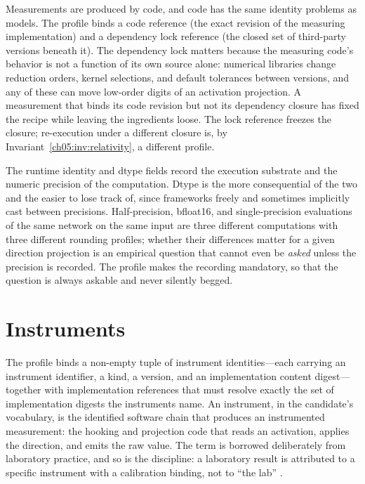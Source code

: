 Measurements are produced by code, and code has the same identity problems
as models. The profile binds a code reference (the exact revision of the
measuring implementation) and a dependency lock reference (the closed set of
third-party versions beneath it). The dependency lock matters because the
measuring code's behavior is not a function of its own source alone:
numerical libraries change reduction orders, kernel selections, and default
tolerances between versions, and any of these can move low-order digits of
an activation projection. A measurement that binds its code revision but not
its dependency closure has fixed the recipe while leaving the ingredients
loose. The lock reference freezes the closure; re-execution under a
different closure is, by
Invariant~\ref{ch05:inv:relativity}, a different profile.

The runtime identity and dtype fields record the execution substrate and the
numeric precision of the computation. Dtype is the more consequential of
the two and the easier to lose track of, since frameworks freely and
sometimes implicitly cast between precisions. Half-precision, bfloat16, and
single-precision evaluations of the same network on the same input are three
different computations with three different rounding profiles; whether their
differences matter for a given direction projection is an empirical question
that cannot even be \emph{asked} unless the precision is recorded. The
profile makes the recording mandatory, so that the question is always
askable and never silently begged.

\section{Instruments}\label{ch05:instruments}

The profile binds a non-empty tuple of instrument identities---each carrying
an instrument identifier, a kind, a version, and an implementation content
digest---together with implementation references that must resolve exactly
the set of implementation digests the instruments name. An instrument, in
the candidate's vocabulary, is the identified software chain that produces
an instrumented measurement: the hooking and projection code that reads an
activation, applies the direction, and emits the raw value. The term is
borrowed deliberately from laboratory practice, and so is the discipline: a
laboratory result is attributed to a specific instrument with a calibration
binding, not to ``the lab'' \cite{vim}.

